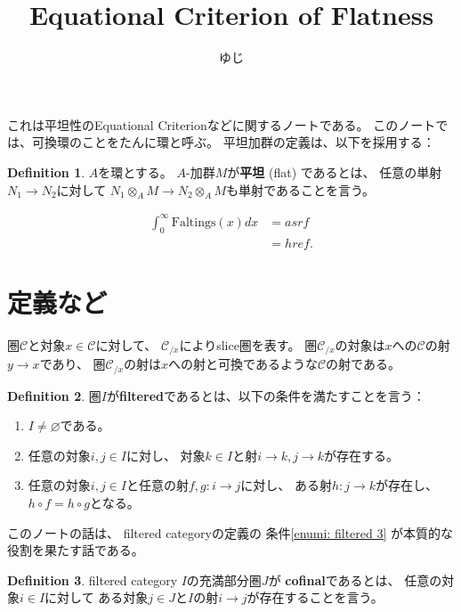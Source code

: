 \documentclass[uplatex]{jsarticle}
\title{Equational Criterion of Flatness}
\author{ゆじ}
\theoremstyle{definition}
\newtheorem{defi}[defi]{Definition}
\theoremstyle{plain}
\renewcommand{\emptyset}{\varnothing}
\newcommand{\mcC}{\mathcal{C}}
\begin{document}
\maketitle

これは平坦性のEquational Criterionなどに関するノートである。
このノートでは、可換環のことをたんに環と呼ぶ。
平坦加群の定義は、以下を採用する：

\begin{defi}
  \(A\)を環とする。
  \(A\)-加群\(M\)が\textbf{平坦} (flat) であるとは、
  任意の単射\(N_1\to N_2\)に対して
  \(N_1\otimes_AM\to N_2\otimes_AM\)も単射であることを言う。
\end{defi}


\begin{align}
  \int_0^{\infty}\mathrm{Faltings}(x) dx &= asrf \\
  &= href. %
\end{align}


\section{定義など}

圏\(\mcC\)と対象\(x\in \mcC\)に対して、
\(\mcC_{/x}\)によりslice圏を表す。
圏\(\mcC_{/x}\)の対象は\(x\)への\(\mcC\)の射\(y\to x\)であり、
圏\(\mcC_{/x}\)の射は\(x\)への射と可換であるような\(\mcC\)の射である。

\begin{defi}\label{defi: filtered}
  圏\(I\)が\textbf{filtered}であるとは、以下の条件を満たすことを言う：
  \begin{enumerate}
    \item
    \(I\neq \emptyset\)である。
    \item
    任意の対象\(i,j\in I\)に対し、
    対象\(k\in I\)と射\(i\to k, j\to k\)が存在する。
    \item \label{enumi: filtered 3}
    任意の対象\(i,j\in I\)と任意の射\(f,g:i\to j\)に対し、
    ある射\(h:j\to k\)が存在し、
    \(h\circ f = h\circ g\)となる。
  \end{enumerate}
\end{defi}

このノートの話は、
filtered categoryの定義の
条件\ref{enumi: filtered 3}
が本質的な役割を果たす話である。

\begin{defi}
  filtered category \(I\)の充満部分圏\(J\)が
  \textbf{cofinal}であるとは、
  任意の対象\(i\in I\)に対して
  ある対象\(j\in J\)と\(I\)の射\(i\to j\)が存在することを言う。
\end{defi}
\end{document}
